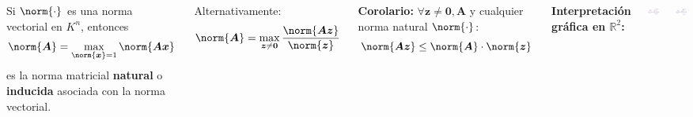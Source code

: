 \documentclass[9pt, aspectratio=169]{beamer}
\begin{document}
\begin{frame}
\begin{columns}[t]
\cx
\begin{theorem}
    Si $\norm{\cdot}$ es una norma vectorial en $K^n$, entonces
    \[ \norm{\bm{A}} = \max_{\norm{\bm{x}} = 1} \norm{\bm{A} \bm{x}} \]
es la norma matricial \textbf{natural} o \textbf{inducida} asociada con la norma vectorial.
\end{theorem}
Alternativamente: 
\[ \norm{\bm{A}} = \max_{\bm{z} \neq \bm{0}} \frac{ \norm{\bm{A} \bm{z}}}{\norm{\bm{z}}} \]

\textbf{Corolario:} $\forall \bm{z} \neq \bm{0}, \bm{A}$ y cualquier norma natural $\norm{\cdot}$:
\[ \norm{\bm{A} \bm{z}} \leq \norm{\bm{A}} \cdot \norm{\bm{z}} \]
\pause

\cx
\textbf{Interpretación gráfica en $\mathbb{R}^2$:}
\begin{center}
    \includegraphics[scale=0.6]{figs/nmat-01.pdf}
\end{center}
\begin{center}
    \includegraphics[scale=0.6]{figs/nmat-02.pdf}
\end{center}
\end{columns}
\end{frame}
\end{document}
